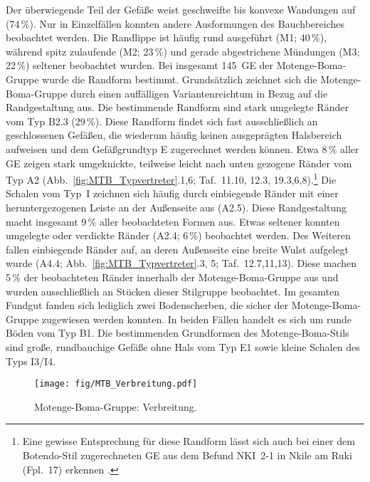 Der überwiegende Teil der Gefäße weist geschweifte bis konvexe Wandungen auf (74\,\%). Nur in Einzelfällen konnten andere Ausformungen des Bauchbereiches beobachtet werden. Die Randlippe ist häufig rund ausgeführt (M1; 40\,\%), während spitz zulaufende (M2; 23\,\%) und gerade abgestrichene Mündungen (M3; 22\,\%) seltener beobachtet wurden. Bei insgesamt 145~GE der Motenge-Boma-Gruppe wurde die Randform bestimmt. Grundsätzlich zeichnet sich die Motenge-Boma-Gruppe durch einen auffälligen Variantenreichtum in Bezug auf die Randgestaltung aus. Die bestimmende Randform sind stark umgelegte Ränder vom Typ B2.3 (29\,\%). Diese Randform findet sich fast ausschließlich an geschlossenen Gefäßen, die wiederum häufig keinen ausgeprägten Halsbereich aufweisen und dem Gefäßgrundtyp E zugerechnet werden können. Etwa 8\,\% aller GE zeigen stark umgeknickte, teilweise leicht nach unten gezogene Ränder vom Typ A2 (Abb.~\ref{fig:MTB_Typvertreter}.1,6; Taf.~11.10, 12.3, 19.3,6,8).\footnote{Eine gewisse Entsprechung für diese Randform lässt sich auch bei einer dem Botendo-Stil zugerechneten GE aus dem Befund NKI~2-1 in Nkile am Ruki (Fpl.~17) erkennen \parencite[150--158, 462 Taf.~28.3]{Wotzka.1995}.} Die Schalen vom Typ~I zeichnen sich häufig durch einbiegende Ränder mit einer heruntergezogenen Leiste an der Außenseite aus (A2.5). Diese Randgestaltung macht insgesamt 9\,\% aller beobachteten Formen aus. Etwas seltener konnten umgelegte oder verdickte Ränder (A2.4; 6\,\%) beobachtet werden. Des Weiteren fallen einbiegende Ränder auf, an deren Außenseite eine breite Wulst aufgelegt wurde (A4.4; Abb.~\ref{fig:MTB_Typvertreter}.3, 5; Taf.~12.7,11,13). Diese machen 5\,\% der beobachteten Ränder innerhalb der Motenge-Boma-Gruppe aus und wurden ausschließlich an Stücken dieser Stilgruppe beobachtet. Im gesamten Fundgut fanden sich lediglich zwei Bodenscherben, die sicher der Motenge-Boma-Gruppe zugewiesen werden konnten. In beiden Fällen handelt es sich um runde Böden vom Typ B1. Die bestimmenden Grundformen des Motenge-Boma-Stils sind große, rundbauchige Gefäße ohne Hals vom Typ E1 sowie kleine Schalen des Typs I3/I4.

\begin{figure*}[p]
	\centering
	\texttt{[image: fig/MTB\_Verbreitung.pdf]}
	\caption{Motenge-Boma-Gruppe: Verbreitung.}
	\label{fig:MTB_Verbreitung}
\end{figure*}


